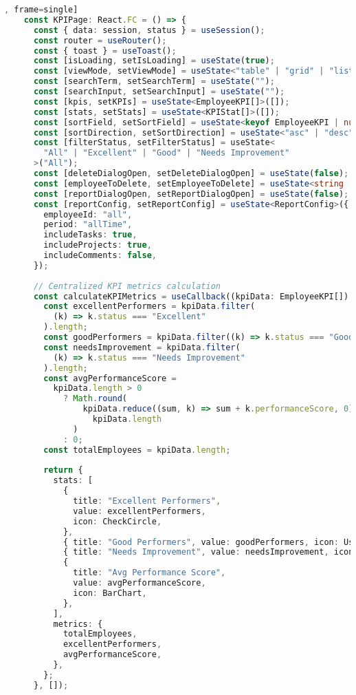 \begin{lstlisting}[language=Typescript, caption=src/app/protected/kpi/page.tsx [front-end], frame=single]
    const KPIPage: React.FC = () => {
      const { data: session, status } = useSession();
      const router = useRouter();
      const { toast } = useToast();
      const [isLoading, setIsLoading] = useState(true);
      const [viewMode, setViewMode] = useState<"table" | "grid" | "list">("table");
      const [searchTerm, setSearchTerm] = useState("");
      const [searchInput, setSearchInput] = useState("");
      const [kpis, setKPIs] = useState<EmployeeKPI[]>([]);
      const [stats, setStats] = useState<KPIStat[]>([]);
      const [sortField, setSortField] = useState<keyof EmployeeKPI | null>(null);
      const [sortDirection, setSortDirection] = useState<"asc" | "desc">("asc");
      const [filterStatus, setFilterStatus] = useState<
        "All" | "Excellent" | "Good" | "Needs Improvement"
      >("All");
      const [deleteDialogOpen, setDeleteDialogOpen] = useState(false);
      const [employeeToDelete, setEmployeeToDelete] = useState<string | null>(null);
      const [reportDialogOpen, setReportDialogOpen] = useState(false);
      const [reportConfig, setReportConfig] = useState<ReportConfig>({
        employeeId: "all",
        period: "allTime",
        includeTasks: true,
        includeProjects: true,
        includeComments: false,
      });
    
      // Centralized KPI metrics calculation
      const calculateKPIMetrics = useCallback((kpiData: EmployeeKPI[]) => {
        const excellentPerformers = kpiData.filter(
          (k) => k.status === "Excellent"
        ).length;
        const goodPerformers = kpiData.filter((k) => k.status === "Good").length;
        const needsImprovement = kpiData.filter(
          (k) => k.status === "Needs Improvement"
        ).length;
        const avgPerformanceScore =
          kpiData.length > 0
            ? Math.round(
                kpiData.reduce((sum, k) => sum + k.performanceScore, 0) /
                  kpiData.length
              )
            : 0;
        const totalEmployees = kpiData.length;
    
        return {
          stats: [
            {
              title: "Excellent Performers",
              value: excellentPerformers,
              icon: CheckCircle,
            },
            { title: "Good Performers", value: goodPerformers, icon: Users },
            { title: "Needs Improvement", value: needsImprovement, icon: Clock },
            {
              title: "Avg Performance Score",
              value: avgPerformanceScore,
              icon: BarChart,
            },
          ],
          metrics: {
            totalEmployees,
            excellentPerformers,
            avgPerformanceScore,
          },
        };
      }, []);
    

\end{lstlisting}
